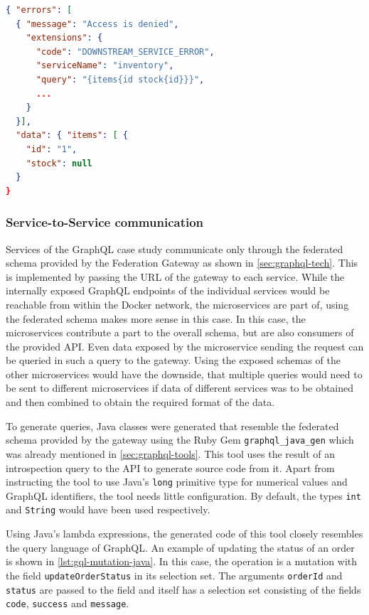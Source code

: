 \begin{lstlisting}[caption={Response to an Unauthorzed Query}, language=json, label={lst:gql-resp-unauthorized}]
{ "errors": [
  { "message": "Access is denied",
    "extensions": { 
      "code": "DOWNSTREAM_SERVICE_ERROR",
      "serviceName": "inventory",
      "query": "{items{id stock{id}}}",
      ...
    }
  }],
  "data": { "items": [ {
    "id": "1",
    "stock": null
  }
}
\end{lstlisting}

\subsubsection{Service-to-Service communication}\label{sec:gql-s2s}

Services of the GraphQL case study communicate only through the federated schema provided by the Federation Gateway as shown in \autoref{sec:graphql-tech}.
This is implemented by passing the \ac{URL} of the gateway to each service.
While the internally exposed GraphQL endpoints of the individual services would be reachable from within the Docker network, the microservices are part of, using the federated schema makes more sense in this case.
In this case, the microservices contribute a part to the overall schema, but are also consumers of the provided \ac{API}.
Even data exposed by the microservice sending the request can be queried in such a query to the gateway.
Using the exposed schemas of the other microservices would have the downside, that multiple queries would need to be sent to different microservices if data of different services was to be obtained and then combined to obtain the required format of the data.

To generate queries, Java classes were generated that resemble the federated schema provided by the gateway using the Ruby Gem \texttt{graphql\_java\_gen} which was already mentioned in \autoref{sec:graphql-tools}.
This tool uses the result of an introspection query to the \ac{API} to generate source code from it.
Apart from instructing the tool to use Java's \texttt{long} primitive type for numerical values and GraphQL identifiers, the tool needs little configuration.
By default, the types \texttt{int} and \texttt{String} would have been used respectively.

Using Java's lambda expressions, the generated code of this tool closely resembles the query language of GraphQL.%
An example of updating the status of an order is shown in \autoref{lst:gql-mutation-java}.
In this case, the operation is a mutation with the field \texttt{updateOrderStatus} in its selection set.
The arguments \texttt{orderId} and \texttt{status} are passed to the field and itself has a selection set consisting of the fields \texttt{code}, \texttt{success} and \texttt{message}.

